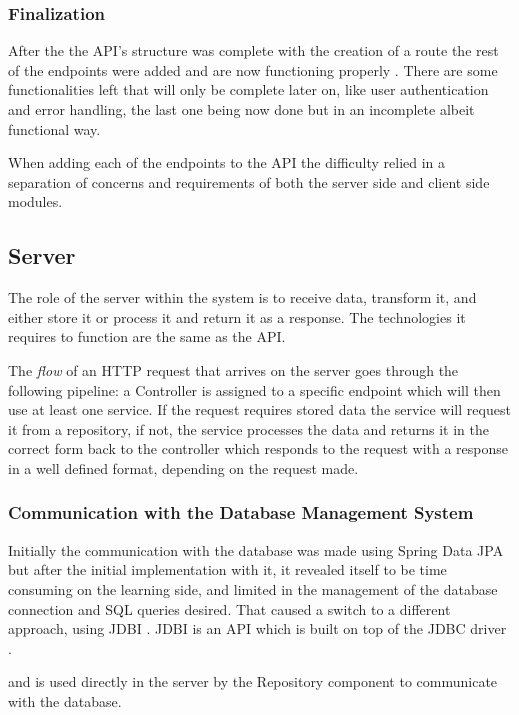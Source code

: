 \documentclass{article}
\begin{document}
            \subsubsection*{Finalization}
            After the the API's structure was complete with the creation of a route the rest of the endpoints were added and are now functioning properly \cite{apidocs}.
            There are some functionalities left that will only be complete later on, like user authentication and error handling, the last one being now done 
            but in an incomplete albeit functional way.

            When adding each of the endpoints to the API the difficulty relied in a separation of concerns and requirements of both the server side and client side modules.
        
            \newpage
        
        \subsection{Server}    
            The role of the server within the system is to receive data, transform it, and either store it or process it and return it as a response. The technologies
            it requires to function are the same as the API.\par
            The \textit{flow} of an HTTP request that arrives on the server goes through the following pipeline: a Controller is assigned to a specific endpoint which will then
            use at least one service. If the request requires stored data the service will request it from a repository, if not, the service processes the data and returns 
            it in the correct form back to the controller which responds to the request with a response in a well defined format, depending on the request made. 

            \subsubsection*{Communication with the Database Management System}
            Initially the communication with the database was made using Spring Data JPA \cite{springjpadocs} but after the initial implementation with it, it revealed 
            itself to be time consuming on the learning side, and limited in the management of the database connection and SQL queries desired. That caused a switch to a different approach, using JDBI \cite{jdbidocs}.
            JDBI \cite{jdbidocs} is an API which is built on top of the JDBC driver \cite{jdbcdocs}.\par and is used directly in the server by the Repository component to communicate with the database.        
\end{document}
